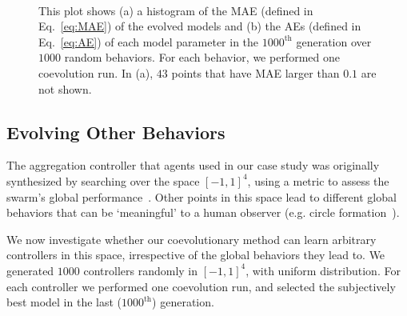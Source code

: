 \begin{figure}[!t]%
	\centering
		\\
		\caption{This plot shows (a) a histogram of the MAE (defined in Eq.~\eqref{eq:MAE}) of the evolved models and (b) the AEs (defined in Eq.~\eqref{eq:AE}) of each model parameter in the $1000^\textrm{th}$ generation over $1000$ random behaviors. For each behavior, we performed one coevolution run. In (a), $43$ points that have MAE larger than $0.1$ are not shown.}
		\label{fig:model_parameters_random_controllers}
\end{figure}

\subsection{Evolving Other Behaviors}\label{sec:evolving_other_behaviors_swarm_simulation}
The aggregation controller that agents used in our case study was originally synthesized by searching over the space $\left[-1,1\right]^4$, using a metric to assess the swarm's global performance~\cite{Gauci2014_ijrr}. Other points in this space lead to different global behaviors that can be `meaningful' to a human observer (e.g. circle formation~\cite{Melvin_DARS2014}). 

We now investigate whether our coevolutionary method can learn arbitrary controllers in this space, irrespective of the global behaviors they lead to. We generated $1000$ controllers randomly in $[-1,1]^4$, with uniform distribution. For each controller we performed one coevolution run, and selected the subjectively best model in the last ($1000^\textrm{th}$) generation. 

